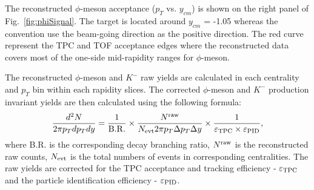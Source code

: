 \documentclass[%
 reprint,	
showpacs,
 amsmath,amssymb,
 aps,
 prc,
]{revtex4-1}
\begin{document}
The reconstructed $\phi$-meson acceptance ($p_T$ vs. $y_{cm}$) is shown on the right panel of Fig.~\ref{fig:phiSignal}. The target is located around $y_{cm}$ = -1.05 whereas the convention use the beam-going direction as the positive direction. The red curve represent the TPC and TOF acceptance edges where the reconstructed data covers most of the one-side mid-rapidity ranges for $\phi$-meson.


The reconstructed $\phi$-meson and $K^-$ raw yields are calculated in each centrality and $p_{T}$ bin within each rapidity slices. The corrected $\phi$-meson and $K^-$ production invariant yields are then calculated using the following formula:
\begin{equation}
  \begin{aligned}
 \frac{d^2N}{2\pi p_{T}dp_{T}dy} = \frac{1}{\rm B.R.} \times \frac{N^{\rm raw}}{N_{\rm evt} 2\pi p_{T}\Delta p_{T}\Delta y} \times \frac{1}{\varepsilon_{\rm TPC}\times\varepsilon_{\rm PID}},
  \end{aligned}
\label{equ:invariantyield}
\end{equation}
where B.R. is the corresponding decay branching ratio, $N^{\rm raw}$ is the reconstructed raw counts, $N_{\rm evt}$ is the total numbers of events in corresponding centralities. The raw yields are corrected for the TPC acceptance and tracking efficiency - $\varepsilon_{\rm TPC}$ and the particle identification efficiency - $\varepsilon_{\rm PID}$.
\end{document}
